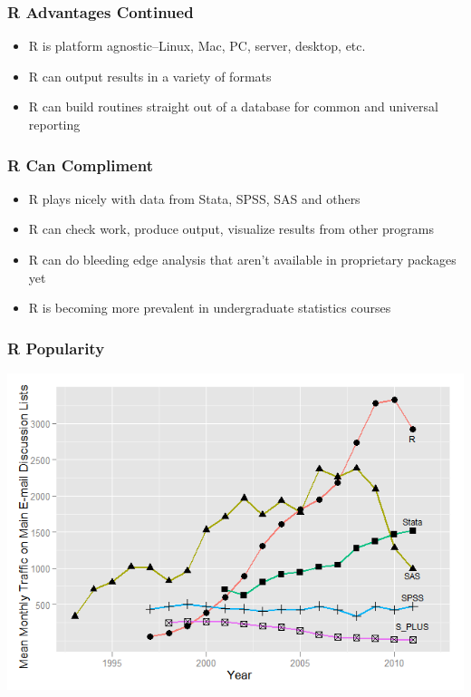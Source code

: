 \documentclass{beamer}
\begin{document}
\begin{frame}
\frametitle{R Advantages Continued}
\begin{itemize}
  \item R is platform agnostic--Linux, Mac, PC, server, desktop, etc.
  \item R can output results in a variety of formats
  \item R can build routines straight out of a database for common and universal reporting
\end{itemize}
\end{frame}

\begin{frame}
\frametitle{R Can Compliment}
\begin{itemize}
\item R plays nicely with data from Stata, SPSS, SAS and others
\item R can check work, produce output, visualize results from other programs
\item R can do bleeding edge analysis that aren't available in proprietary packages yet
\item R is becoming more prevalent in undergraduate statistics courses
\end{itemize}
\end{frame}


\begin{frame}
\frametitle{R Popularity}
\vspace{-.1in}
\begin{center}
\includegraphics[height=.78\paperheight]{rlistserv}
\end{center}
\end{frame}
\end{document}
